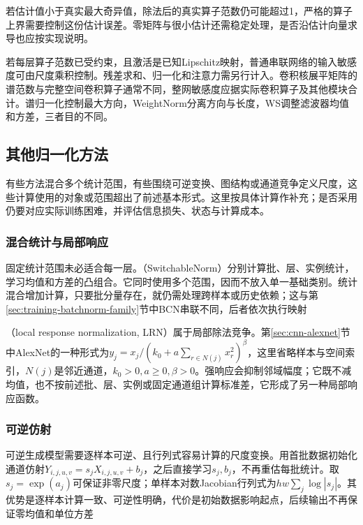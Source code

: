 若估计值小于真实最大奇异值，除法后的真实算子范数仍可能超过1，严格的算子上界需要控制这份估计误差。零矩阵与很小估计还需稳定处理，是否沿估计向量求导也应按实现说明。

若每层算子范数已受约束，且激活是已知Lipschitz映射，普通串联网络的输入敏感度可由尺度乘积控制。残差求和、归一化和注意力需另行计入。卷积核展平矩阵的谱范数与完整空间卷积算子通常不同，整网敏感度应据实际卷积算子及其他模块合计。谱归一化控制最大方向，WeightNorm分离方向与长度，WS调整滤波器均值和方差，三者目的不同。

\subsection{其他归一化方法}
\label{sec:training-other-normalization}
有些方法混合多个统计范围，有些围绕可逆变换、图结构或通道竞争定义尺度，这些计算使用的对象或范围超出了前述基本形式。这里按具体计算作补充；是否采用仍要对应实际训练困难，并评估信息损失、状态与计算成本。

\subsubsection{混合统计与局部响应}
\label{sec:training-normalization-combinations}
\label{sec:training-switchable-bcn}
固定统计范围未必适合每一层。（SwitchableNorm）分别计算批、层、实例统计，学习均值和方差的凸组合。它同时使用多个范围，因而不放入单一基础类别。统计混合增加计算，只要批分量存在，就仍需处理跨样本或历史依赖；这与第\ref{sec:training-batchnorm-family}节中BCN串联不同，后者依次执行映射

（local response normalization, LRN）属于局部除法竞争。第\ref{sec:cnn-alexnet}节中AlexNet的一种形式为$y_j=x_j/(k_0+a\sum_{r\in N(j)}x_r^2)^\beta$，这里省略样本与空间索引，$N(j)$是邻近通道，$k_0>0,a\geq0,\beta>0$。强响应会抑制邻域幅度；它既不减均值，也不按前述批、层、实例或固定通道组计算标准差，它形成了另一种局部响应函数。

\subsubsection{可逆仿射}
\label{sec:training-actnorm}
可逆生成模型需要逐样本可逆、且行列式容易计算的尺度变换。用首批数据初始化通道仿射$Y_{i,j,u,v}=s_jX_{i,j,u,v}+b_j$，之后直接学习$s_j,b_j$，不再重估每批统计。取$s_j=\exp(a_j)$可保证非零尺度；单样本对数Jacobian行列式为$hw\sum_j\log|s_j|$。其优势是逐样本计算一致、可逆性明确，代价是初始数据影响起点，后续输出不再保证零均值和单位方差

